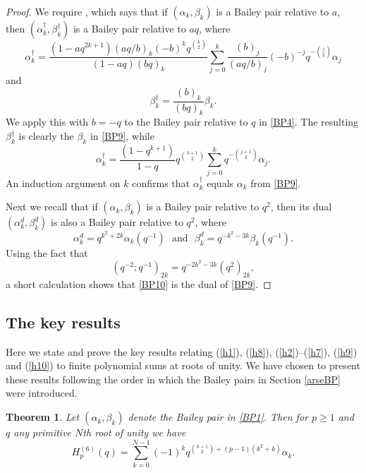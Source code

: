 \documentclass[11pt,reqno]{amsart}
\newtheorem{theorem}{Theorem}[section]
\theoremstyle{definition}
\numberwithin{equation}{section}
\renewcommand{\=}{\;=\;}
\begin{document}
\begin{proof}
	We require \cite[Eq. (2.4)]{Lo.5}, which says that if $(\alpha_k,\beta_k)$ is a Bailey pair relative to $a$, then $(\alpha_k^{\dag},\beta_k^{\dag})$ is a Bailey pair relative to $aq$, where
	\begin{equation} \label{alphadag}
		\alpha_k^{\dag} = \frac{(1-aq^{2k+1})(aq/b)_k(-b)^kq^{\binom{k}{2}}}{(1-aq)(bq)_k} \sum_{j=0}^k \frac{(b)_j}{(aq/b)_j} (-b)^{-j} q^{-\binom{j}{2}} \alpha_j
	\end{equation}
	and
	\begin{equation} \label{betadag}
		\beta_k^{\dag} = \frac{(b)_k}{(bq)_k}\beta_k.
	\end{equation}
	We apply this with $b = -q$ to the Bailey pair relative to $q$ in \eqref{BP4}.  The resulting $\beta_k^{\dag}$ is clearly the $\beta_k$ in \eqref{BP9}, while
	\begin{equation}
		\alpha_k^{\dag} = \frac{(1-q^{k+1})}{1-q} q^{\binom{k+1}{2}} \sum_{j=0}^k q^{-\binom{j+1}{2}}\alpha_j.
	\end{equation}  
	An induction argument on $k$ confirms that $\alpha_k^{\dag}$ equals $\alpha_k$ from \eqref{BP9}. 
	
Next we recall that if $(\alpha_k,\beta_k)$ is a Bailey pair relative to $q^2$, then its dual \cite{An1} $(\alpha_k^d,\beta_k^d)$ is also a Bailey pair relative to $q^2$, where
\begin{equation}
\alpha_k^d = q^{k^2+2k}\alpha_k(q^{-1}) \ \ \ \text{and} \ \ \ \beta_k^d = q^{-k^2-3k}\beta_k(q^{-1}).
\end{equation}	
Using the fact that
\begin{equation}
(q^{-2};q^{-1})_{2k} = q^{-2k^2-3k}(q^2)_{2k},
\end{equation}
a short calculation shows that \eqref{BP10} is the dual of \eqref{BP9}.   
\end{proof}

\subsection{The key results}
Here we state and prove the key results relating (\ref{h1}), (\ref{h8}), (\ref{h2})--(\ref{h7}), (\ref{h9}) and (\ref{h10}) to finite polynomial sums at roots of unity. We have chosen to present these results following the order in which the Bailey pairs in Section \ref{arseBP} were introduced.
\begin{theorem} \label{Baileyfamily1}
	Let $(\alpha_k,\beta_k)$ denote the Bailey pair in \eqref{BP1}.   Then for $p \geq 1$ and $q$ any primitive $N$th root of unity we have
	\begin{equation} \label{Baileyfamily1eq}
		H_p^{(6)}(q) = \sum_{k=0}^{N-1} (-1)^k q^{\binom{k+1}{2} +(p-1)(k^2+k)} \alpha_k.
	\end{equation} 
\end{theorem}
\end{document}
